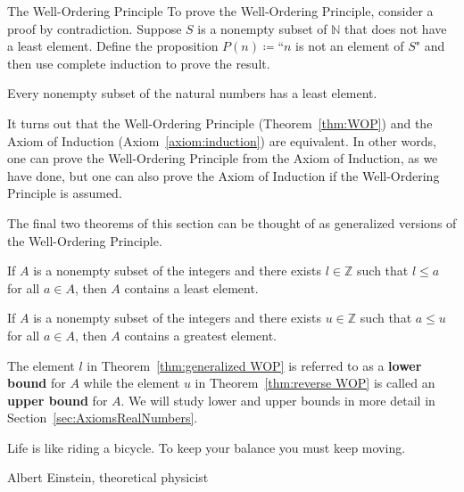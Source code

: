 \begin{section}{The Well-Ordering Principle}
To prove the Well-Ordering Principle, consider a proof by contradiction. Suppose $S$ is a nonempty subset of $\mathbb{N}$ that does not have a least element.  Define the proposition $P(n)\coloneqq $``$n$ is not an element of $S$" and then use complete induction to prove the result.

\begin{theorem}\label{thm:WOP}
Every nonempty subset of the natural numbers has a least element.
\end{theorem}

It turns out that the Well-Ordering Principle (Theorem~\ref{thm:WOP}) and the Axiom of Induction (Axiom~\ref{axiom:induction}) are equivalent.  In other words, one can prove the Well-Ordering Principle from the Axiom of Induction, as we have done, but one can also prove the Axiom of Induction if the Well-Ordering Principle is assumed.

The final two theorems of this section can be thought of as generalized versions of the Well-Ordering Principle.

\begin{theorem}\label{thm:generalized WOP}
If $A$ is a nonempty subset of the integers and there exists $l\in \mathbb{Z}$ such that $l\leq a$ for all $a\in A$, then $A$ contains a least element.
\end{theorem}

\begin{theorem}\label{thm:reverse WOP}
If $A$ is a nonempty subset of the integers and there exists $u\in \mathbb{Z}$ such that $a\leq u$ for all $a\in A$, then $A$ contains a greatest element.
\end{theorem}

The element $l$ in Theorem~\ref{thm:generalized WOP} is referred to as a \textbf{lower bound} for $A$ while the element $u$ in Theorem~\ref{thm:reverse WOP} is called an \textbf{upper bound} for $A$. We will study lower and upper bounds in more detail in Section~\ref{sec:AxiomsRealNumbers}.

\epigraph{Life is like riding a bicycle. To keep your balance you must keep moving.}{Albert Einstein, theoretical physicist}

\end{section}
